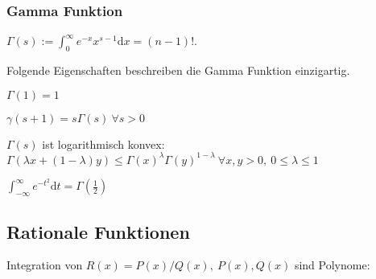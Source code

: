 \subsubsection{Gamma Funktion}
$\Gamma(s):= \int_{0}^{\infty} e^{-x}x^{s-1} \mathrm{d}x = (n-1)!$.

Folgende Eigenschaften beschreiben die Gamma Funktion einzigartig.
\begin{inparaenum}
    \item $\Gamma(1) = 1$
    \item $\gamma(s + 1) = s \Gamma(s) \ \forall s > 0$
    \item $\Gamma(s)$ ist logarithmisch konvex: $\Gamma(\lambda x + (1- \lambda)y) \le \Gamma(x)^\lambda \Gamma(y)^{1-\lambda} \ \forall x,y > 0, \ 0 \le \lambda \le 1$
\end{inparaenum}
\begin{compactitem}
    \item $\int_{-\infty}^{\infty} e^{-t^2}\mathrm{d}t = \Gamma(\frac{1}{2})$
\end{compactitem}

\subsection{Rationale Funktionen}
Integration von $R(x) = P(x) / Q(x), \ P(x), Q(x)$ sind Polynome:
\begin{compactitem}
    \item 
\end{compactitem}

